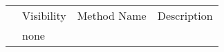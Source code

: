 \documentclass{article}
\begin{document}
\begin{table}[]
\begin{tabular}{|p{2cm}||p{1.5cm}||p{2cm}||p{7cm}||p{3cm}|}
\rowcolor[HTML]{C0C0C0} 
\cellcolor[HTML]{C0C0C0}{\color[HTML]{000000} }                             & Visibility & Method Name & \multicolumn{2}{l|}{\cellcolor[HTML]{C0C0C0}Description} \\ \cline{2-5} 

\multirow{-2}{*}{\cellcolor[HTML]{C0C0C0}{\color[HTML]{000000} Methods}}   & \multicolumn{4}{l|}{none }                               \\ \cline{2-5}


\end{tabular}
\end{table}

\end{document}
